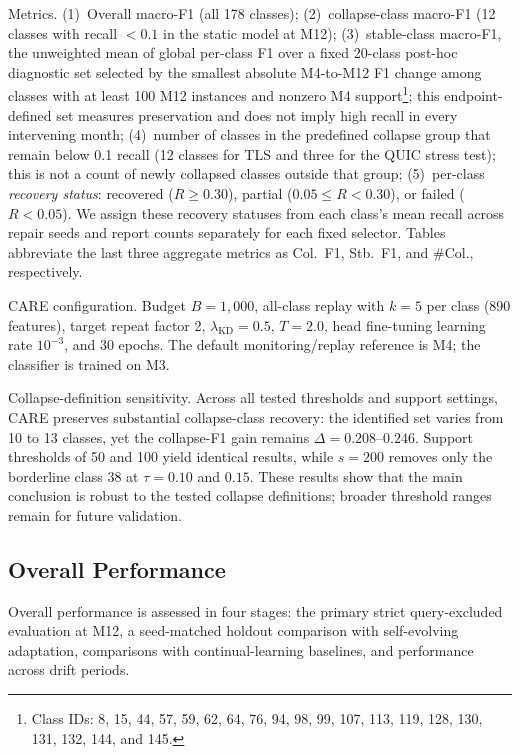 \documentclass[journal]{IEEEtran}
\newcommand{\ours}{CARE}  %
\begin{document}
Metrics.
(1)~Overall macro-F1 (all 178 classes);
(2)~collapse-class macro-F1 (12 classes with recall ${<}0.1$ in the static model at M12);
(3)~stable-class macro-F1, the unweighted mean of global per-class F1 over a fixed 20-class post-hoc diagnostic set selected by the smallest absolute M4-to-M12 F1 change among classes with at least 100 M12 instances and nonzero M4 support\footnote{Class IDs: 8, 15, 44, 57, 59, 62, 64, 76, 94, 98, 99, 107, 113, 119, 128, 130, 131, 132, 144, and 145.}; this endpoint-defined set measures preservation and does not imply high recall in every intervening month;
(4)~number of classes in the predefined collapse group that remain below 0.1 recall (12 classes for TLS and three for the QUIC stress test); this is not a count of newly collapsed classes outside that group;
(5)~per-class \textit{recovery status}: recovered ($R{\geq}0.30$), partial ($0.05{\leq}R{<}0.30$), or failed ($R{<}0.05$). We assign these recovery statuses from each class's mean recall across repair seeds and report counts separately for each fixed selector.
Tables abbreviate the last three aggregate metrics as Col.\ F1, Stb.\ F1, and \#Col., respectively.

\ours{} configuration.
Budget $B{=}1{,}000$, all-class replay with $k{=}5$ per class (890 features), target repeat factor 2, $\lambda_{\text{KD}}{=}0.5$, $T{=}2.0$, head fine-tuning learning rate $10^{-3}$, and 30 epochs. The default monitoring/replay reference is M4; the classifier is trained on M3.

Collapse-definition sensitivity.
Across all tested thresholds and support settings, \ours{} preserves substantial collapse-class recovery: the identified set varies from 10 to 13 classes, yet the collapse-F1 gain remains $\Delta{=}0.208$--$0.246$. Support thresholds of 50 and 100 yield identical results, while $s{=}200$ removes only the borderline class 38 at $\tau{=}0.10$ and $0.15$. These results show that the main conclusion is robust to the tested collapse definitions; broader threshold ranges remain for future validation.

\subsection{Overall Performance}
\label{sec:main_results}

Overall performance is assessed in four stages: the primary strict query-excluded evaluation at M12, a seed-matched holdout comparison with self-evolving adaptation, comparisons with continual-learning baselines, and performance across drift periods.
\end{document}
